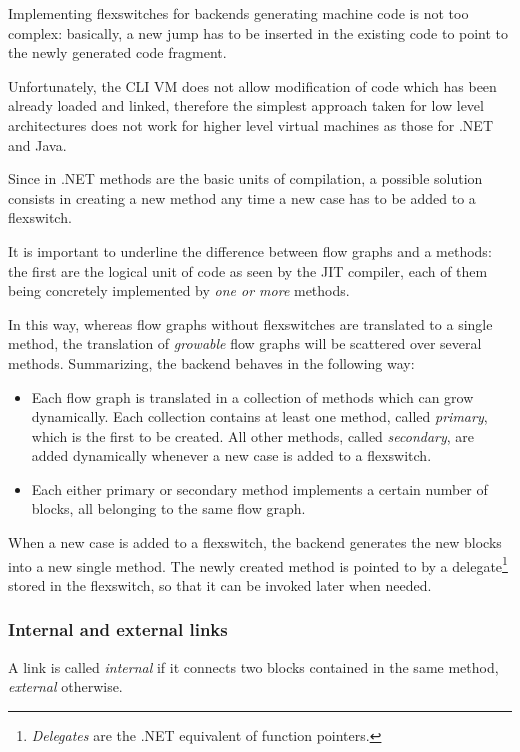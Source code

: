 Implementing flexswitches for backends generating machine code is
not too complex: basically, a new jump has to be inserted in the
existing code to point to the newly generated code fragment.

Unfortunately, the CLI VM does not allow modification of code which
has been already loaded and linked, therefore the simplest approach
taken for low level architectures does not work for higher level 
virtual machines as those for .NET and Java.

Since in .NET methods are the basic units of compilation, a possible
solution consists in creating a new method 
any time a new case has to be added to a flexswitch.

It is important to underline the difference between flow graphs and a methods:
the first are the logical unit of code as seen by the JIT compiler, each of
them being concretely implemented by \emph{one or more} methods.

In this way, whereas flow graphs without flexswitches are translated to a
single method, the translation of \emph{growable} flow graphs will be
scattered over several methods.  Summarizing, the backend behaves in the
following way:
\begin{itemize}
\item Each flow graph is translated in a collection of methods which
  can grow dynamically. Each collection contains at least one
  method, called \emph{primary}, which is the first to be created.
  All other methods, called \emph{secondary}, are added dynamically 
  whenever a new case is added to a flexswitch.

\item Each either primary or secondary method implements a certain
  number of blocks, all belonging to the same flow graph.
\end{itemize} 

When a new case is added to a flexswitch, the backend generates the new blocks
into a new single method.  The newly created method is pointed to by a
delegate\footnote{\emph{Delegates} are the .NET equivalent of function
  pointers.} stored in the flexswitch, so that it can be invoked later when
needed.

\subsubsection{Internal and external links}

A link is called \emph{internal} if it connects two blocks contained
in the same method,
\emph{external} otherwise.


